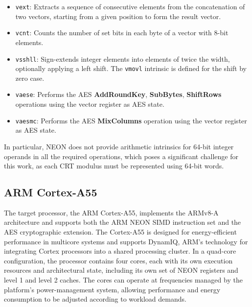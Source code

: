 \begin{itemize}
    \item \texttt{vext}: Extracts a sequence of consecutive elements from the concatenation of two vectors, starting from a given position to form the result vector.

    \item \texttt{vcnt}: Counts the number of set bits in each byte
    of a vector with 8-bit elements.
    
    \item \texttt{vsshll}: Sign-extends integer elements into elements
    of twice the width, optionally applying a left shift. The \texttt{vmovl} intrinsic is defined for the shift by zero case.

    \item \texttt{vaese}: Performs the AES \textbf{AddRoundKey}, \textbf{SubBytes}, \textbf{ShiftRows} operations using the vector register as AES state.

    \item \texttt{vaesmc}: Performs the AES \textbf{MixColumns} operation using the vector register as AES state.
    
\end{itemize}

In particular, NEON does not provide arithmetic intrinsics for 64-bit integer operands in all the required operations, which poses a significant challenge for this work, as each CRT modulus must be represented using 64-bit words.

\subsection{ARM Cortex-A55}

The target processor, the ARM Cortex-A55, implements the ARMv8-A architecture and supports both the ARM NEON SIMD instruction set and the AES cryptographic extension.      %
The Cortex-A55 is designed for energy-efficient performance in multicore systems and supports DynamIQ, ARM's technology for integrating Cortex processors into a shared processing cluster. In a quad-core configuration, the processor contains four cores, each with its own execution resources and architectural state, including its own set of NEON registers and level 1 and level 2 caches. The cores can operate at frequencies managed by the platform's power-management system, allowing performance and energy consumption to be adjusted according to workload demands.

